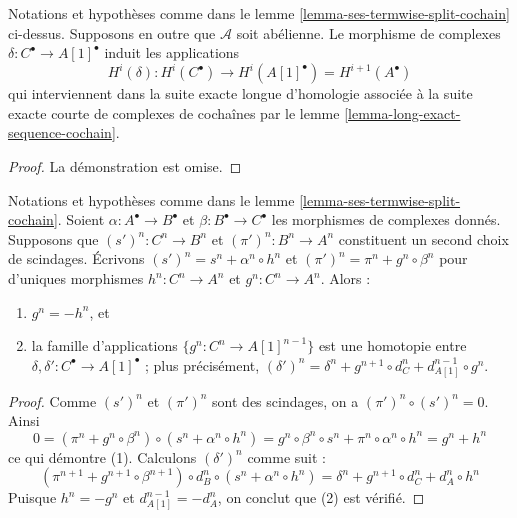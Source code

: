 \begin{lemma}
\label{lemma-ses-termwise-split-long-cochain}
Notations et hypothèses comme dans le
lemme \ref{lemma-ses-termwise-split-cochain} ci-dessus.
Supposons en outre que $\mathcal{A}$ soit abélienne.
Le morphisme de complexes $\delta : C^\bullet \to A[1]^\bullet$
induit les applications
$$
H^i(\delta) :
H^i(C^\bullet) \longrightarrow H^i(A[1]^\bullet) = H^{i + 1}(A^\bullet)
$$
qui interviennent dans la suite exacte longue d’homologie associée
à la suite exacte courte de complexes de cochaînes par le
lemme \ref{lemma-long-exact-sequence-cochain}.
\end{lemma}

\begin{proof}
La démonstration est omise.
\end{proof}

\begin{lemma}
\label{lemma-ses-termwise-split-homotopy-cochain}
Notations et hypothèses comme dans le
lemme \ref{lemma-ses-termwise-split-cochain}.
Soient $\alpha : A^\bullet \to B^\bullet$ et
$\beta : B^\bullet \to C^\bullet$ les
morphismes de complexes donnés.
Supposons que $(s')^n : C^n \to B^n$ et $(\pi')^n : B^n \to A^n$
constituent un second choix de scindages.
Écrivons $(s')^n = s^n + \alpha^n \circ h^n$ et
$(\pi')^n = \pi^n + g^n \circ \beta^n$ pour d'uniques
morphismes $h^n : C^n \to A^n$ et $g^n : C^n \to A^n$. Alors :
\begin{enumerate}
\item $g^n = - h^n$, et
\item la famille d'applications $\{g^n : C^n \to A[1]^{n - 1}\}$ est une homotopie
entre $\delta, \delta' : C^\bullet \to A[1]^\bullet$ ; plus précisément,
$(\delta')^n = \delta^n + g^{n + 1} \circ d_C^n + d_{A[1]}^{n - 1} \circ g^n$.
\end{enumerate}
\end{lemma}

\begin{proof}
Comme $(s')^n$ et $(\pi')^n$ sont des scindages, on a $(\pi')^n \circ (s')^n = 0$.
Ainsi
$$
0 = ( \pi^n + g^n \circ \beta^n ) \circ ( s^n + \alpha^n \circ h^n ) =
g^n \circ \beta^n \circ s^n + \pi^n \circ \alpha^n \circ h^n =
g^n + h^n
$$
ce qui démontre (1). Calculons $(\delta')^n$ comme suit :
$$
( \pi^{n + 1} + g^{n + 1} \circ \beta^{n + 1} )
\circ d_B^n \circ
( s^n + \alpha^n \circ h^n )
= \delta^n + g^{n + 1} \circ d_C^n + d_A^n \circ h^n
$$
Puisque $h^n = -g^n$ et $d_{A[1]}^{n - 1} = -d_A^n$, on conclut que (2)
est vérifié.
\end{proof}




